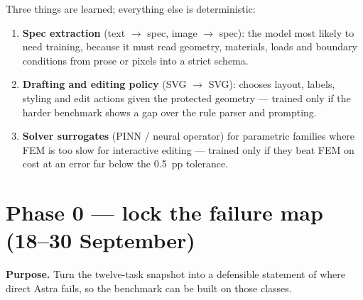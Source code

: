 \documentclass[11pt,a4paper]{article}
\begin{document}
Three things are learned; everything else is deterministic:
\begin{enumerate}
  \item \textbf{Spec extraction} (text $\rightarrow$ spec, image $\rightarrow$ spec): the model most likely to need training, because it must read geometry, materials, loads and boundary conditions from prose or pixels into a strict schema.
  \item \textbf{Drafting and editing policy} (SVG $\rightarrow$ SVG): chooses layout, labels, styling and edit actions given the protected geometry --- trained only if the harder benchmark shows a gap over the rule parser and prompting.
  \item \textbf{Solver surrogates} (PINN / neural operator) for parametric families where FEM is too slow for interactive editing --- trained only if they beat FEM on cost at an error far below the 0.5~pp tolerance.
\end{enumerate}

\section{Phase 0 --- lock the failure map (18--30 September)}

\textbf{Purpose.} Turn the twelve-task snapshot into a defensible statement of where direct Astra fails, so the benchmark can be built on those classes.
\end{document}
